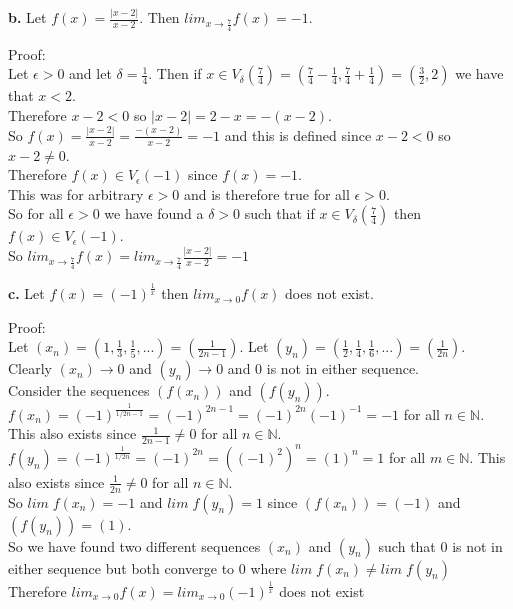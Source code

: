 \documentclass{article}
\begin{document}
{\Large \textbf{b.}} Let $f(x) =\frac{|x - 2|}{x - 2}$. Then $lim _{x\rightarrow\frac{7}{4}} f(x) = -1$.
\begin{center}
    \doublespacing
    Proof:
    \\Let $\epsilon > 0$ and let $\delta =\frac{1}{4}$. Then if $x\in V_{\delta} (\frac{7}{4}) = (\frac{7}{4} -\frac{1}{4},\frac{7}{4} +\frac{1}{4}) = (\frac{3}{2}, 2)$ we have that $x < 2$.
    \\Therefore $x - 2 < 0$ so $|x - 2| = 2 - x = -(x - 2)$.
    \\So $f(x) =\frac{|x - 2|}{x - 2} =\frac{-(x - 2)}{x - 2} = -1$ and this is defined since $x - 2 < 0$ so $x - 2\neq 0$.
    \\Therefore $f(x)\in V_{\epsilon} (-1)$ since $f(x) = -1$.
    \\This was for arbitrary $\epsilon > 0$ and is therefore true for all $\epsilon > 0$.
    \\So for all $\epsilon > 0$ we have found a $\delta > 0$ such that if $x\in V_{\delta} (\frac{7}{4})$ then $f(x)\in V_{\epsilon} (-1)$.
    \\So $lim _{x\rightarrow\frac{7}{4}} f(x) = lim _{x\rightarrow\frac{7}{4}}\frac{|x - 2|}{x - 2} = -1$ \qedsymbol
\end{center}

{\Large \textbf{c.}} Let $f(x) = (-1)^{\frac{1}{x}}$ then $lim _{x\rightarrow 0} f(x)$ does not exist.
\begin{center}
    \doublespacing
    Proof:
    \\Let $(x_n) = (1,\frac{1}{3},\frac{1}{5}, ...) = (\frac{1}{2n - 1})$. Let $(y_n) = (\frac{1}{2},\frac{1}{4},\frac{1}{6}, ...) = (\frac{1}{2n})$.
    \\Clearly $(x_n)\rightarrow 0$ and $(y_n)\rightarrow 0$ and 0 is not in either sequence.
    \\Consider the sequences $(f(x_n))$ and $(f(y_n))$.
    \\$f(x_n) = (-1)^{\frac{1}{1/2n - 1}} = (-1)^{2n - 1} = (-1)^{2n} (-1)^{-1} = -1$ for all $n\in\mathbb{N}$. This also exists since $\frac{1}{2n - 1}\neq 0$ for all $n\in\mathbb{N}$.
    \\$f(y_n) = (-1)^{\frac{1}{1/2n}} = (-1)^{2n} = ((-1)^2)^n = (1)^n = 1$ for all $m\in\mathbb{N}$. This also exists since $\frac{1}{2n}\neq 0$ for all $n\in\mathbb{N}$.
    \\So $lim\; f(x_n) = -1$ and $lim\; f(y_n) = 1$ since $(f(x_n)) = (-1)$ and $(f(y_n)) = (1)$.
    \\So we have found two different sequences $(x_n)$ and $(y_n)$ such that 0 is not in either sequence but both converge to 0 where $lim\; f(x_n)\neq lim\; f(y_n)$
    \\Therefore $lim _{x\rightarrow 0} f(x) = lim _{x\rightarrow 0} (-1)^{\frac{1}{x}}$ does not exist \qedsymbol
\end{center}
\end{document}
